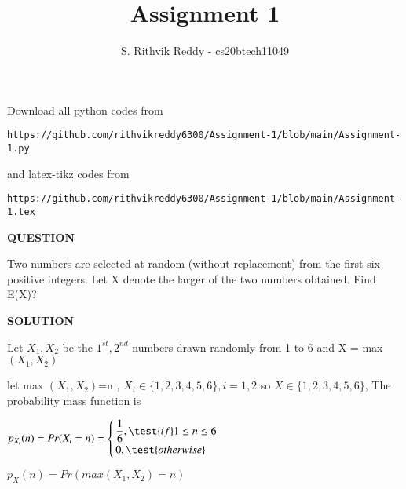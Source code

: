 \documentclass[journal,12pt,twocolumn]{IEEEtran}
\begin{document}
     \def\rightbox#1{\makebox[0in][r]{#1}}
     \def\centbox#1{\makebox[0in]{#1}}
     \def\topbox#1{\raisebox{-\baselineskip}[0in][0in]{#1}}
     \def\midbox#1{\raisebox{-0.5\baselineskip}[0in][0in]{#1}}
\vspace{3cm}
\title{Assignment 1}
\author{S. Rithvik Reddy - cs20btech11049}
\maketitle
\newpage
\bigskip
\renewcommand{\thefigure}{\theenumi}
\renewcommand{\thetable}{\theenumi}
Download all python codes from 
\begin{lstlisting}
https://github.com/rithvikreddy6300/Assignment-1/blob/main/Assignment-1.py
\end{lstlisting}
%
and latex-tikz codes from 
%
\begin{lstlisting}
https://github.com/rithvikreddy6300/Assignment-1/blob/main/Assignment-1.tex
\end{lstlisting}
\vspace{0.5cm}
\textbf{QUESTION}
\vspace{0.5cm}

Two numbers are selected at random (without replacement) from the first six positive integers. Let X denote the larger of the two numbers obtained. Find E(X)?

\vspace{0.5cm}
\textbf{SOLUTION}
\vspace{0.5cm}

Let $X_1,X_2$ be the $1^{st},2^{nd}$ numbers drawn randomly from 1 to 6 and X = max $(X_1,X_2)$

let max $(X_1,X_2)$=n , $X_i\in \{ 1,2,3,4,5,6 \}, i=1,2$ so $X \in \{ 1,2,3,4,5,6 \}$, The probability mass function is 

\vspace{0.5cm}
$p_{X_i}(n)= Pr(X_i=n)= \begin{cases}
\dfrac{1}{6},  \test{ if } 1 \leq n \leq 6 \\
0,  \test{  otherwise }
\end{cases}$

 $p_X(n) =Pr(max (X_1,X_2)=n)$
 
\end{document}
